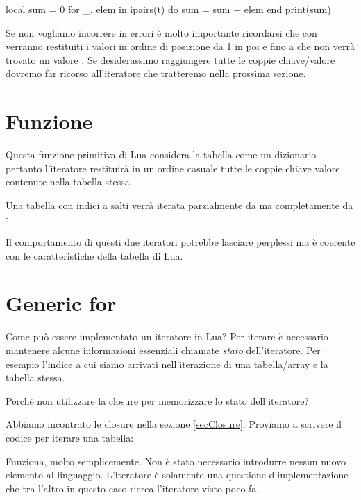local sum = 0
for _, elem in ipairs(t) do
    sum = sum + elem
end
print(sum)
\endlines
{}

Se non vogliamo incorrere in errori è molto importante ricordarsi che con
 verranno restituiti i valori in ordine di posizione da 1 in poi e
fino a che non verrà trovato un valore . Se desiderassimo raggiungere
tutte le coppie chiave/valore dovremo far ricorso all'iteratore 
che tratteremo nella prossima sezione.


\section{Funzione }
\label{secFondPairsIterator}

Questa funzione primitiva di Lua considera la tabella come un dizionario
pertanto l'iteratore restituirà in un ordine casuale tutte le coppie chiave
valore contenute nella tabella stessa.

Una tabella con indici a salti verrà iterata parzialmente da  ma
completamente da :

Il comportamento di questi due iteratori potrebbe lasciare perplessi ma è
coerente con le caratteristiche della tabella di Lua.


\section{Generic for}

Come può essere implementato un iteratore in Lua? Per iterare è necessario
mantenere alcune informazioni essenziali chiamate \emph{stato} dell'iteratore.
Per esempio l'indice a cui siamo arrivati nell'iterazione di una tabella/array
e la tabella stessa.

Perchè non utilizzare la closure per memorizzare lo stato dell'iteratore?

Abbiamo incontrato le closure nella sezione \ref{secClosure}. Proviamo a
scrivere il codice per iterare una tabella:

Funziona, molto semplicemente. Non è stato necessario introdurre nessun nuovo
elemento al linguaggio. L'iteratore è solamente una questione d'implementazione
che tra l'altro in questo caso ricrea l'iteratore  visto poco fa.

